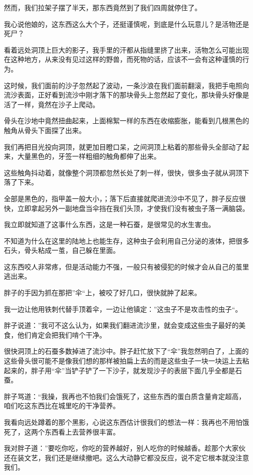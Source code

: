 然而，我们拉架子摆了半天，那东西竟然到了我们四周就停住了。

我心说他娘的，这东西这么大个子，还挺谨慎呢，到底是什么玩意儿？是活物还是死尸？

看着远处洞顶上巨大的影子，我手里的汗都从指缝里挤了出来，活物怎么可能出现在这种地方，从来没有见过这样的野兽，而死物的话，应该不一会有这种谨慎的行为。

这时候，我们面前的沙子忽然起了波动，一条沙浪在我们面前翻滚，我把手电照向流沙表面，正好看到流沙中刚才落下的那块骨头上忽然起了变化，那块骨头好像是活了一样，竟然在沙子上爬动。

骨头在沙地中竟然扭曲起来，上面棉絮一样的东西在收缩膨胀，能看到几根黑色的触角从骨头下面探了出来。

我们再把目光投向洞顶，就更加目瞪口呆，之间洞顶上粘着的那些骨头全部动了起来，大量黑色的，牙签一样粗细的触角都伸了出来。

这些触角抖动着，就像整个洞顶都忽然长处了刺一样，很快，很多虫子就从洞顶下落了下来。

全部是黑色的，指甲盖一般大小，；落下后直接就爬进流沙中不见了，胖子反应很快，立即拿起另外一副地盘当伞挡在我们头顶，才使我们没有被虫子落一满脑袋。

我立即就知道了这事什么东西，这是一种石蚕，是很常见的水生害虫。

不知道为什么在这里的陆地上也能生存，这种虫子会利用自己分泌的液体，把很多石头，骨头粘成一茧，自己躲在里面。

这东西咬人非常疼，但是活动能力不强，一般只有被侵犯的时候才会从自己的茧里逃出来。

胖子的手因为抓在那把”伞“上，被咬了好几口，很快就肿了起来。

我一边让他用铁刺代替手顶着伞，一边让他镇定：”这虫子不是攻击性的虫子“。

胖子说道：”我可不这么认为，如果我们翻进流沙里，就会变成这些虫子最好的美食，他们肯定会把我们啃个干净。

很快洞顶上的石蚕多数掉进了流沙中。胖子赶忙放下了“伞”我忽然明白了，上面的这些骨头很可能不是像我们想的那样被拍扁上去的而是这些虫子一块一块运上去粘起来的，胖子用“伞”当铲子铲了一下沙子，就发现沙子的表层下面几乎全都是石蚕。

胖子骂道：“我操，我再也不怕我们会饿死了，这些东西的蛋白质含量肯定超高，咱们吃这东西比在城里吃的干净营养。

我看向远处蹲着的那个黑影，心说这东西估计很我们的想法一样：我再也不用怕饿死了，这两个东西看上去营养很丰富。

我对胖子道：”要吃你吃，你吃的营养越好，别人吃你的时候越香。趁那个大家伙还在装文艺，我们还是继续撤吧。这么大动静它都没反应，说不定它根本就没注意我们。

